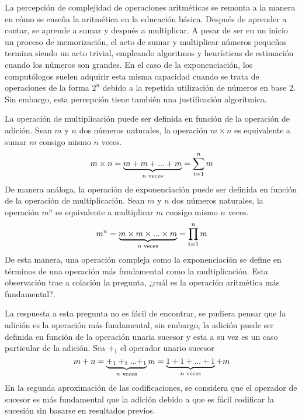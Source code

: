 La percepción de complejidad de operaciones aritméticas se remonta a la manera en cómo se enseña la aritmética en la educación básica. Después de aprender a contar, se aprende a sumar y después a multiplicar. A pesar de ser en un inicio un proceso de memorización, el acto de sumar y multiplicar números pequeños termina siendo un acto trivial, empleando algoritmos y heurísticas de estimación cuando los números son grandes. En el caso de la exponenciación, los computólogos suelen adquirir esta misma capacidad cuando se trata de operaciones de la forma $ 2^{n} $ debido a la repetida utilización de números en base 2. Sin embargo, esta percepción tiene también una justificación algorítmica.

La operación de multiplicación puede ser definida en función de la operación de adición. Sean $ m $ y $ n $ dos números naturales, la operación $ m \times n $ es equivalente a sumar $ m $ consigo mismo $ n $ veces.
\begin{equation}
  \label{eq:numeral:muldef}
  m \times n = \underbrace{m + m + ... + m}_\text{$ n $ veces} = \sum_{i=1}^{n} m
\end{equation}
De manera análoga, la operación de exponenciación puede ser definida en función de la operación de multiplicación. Sean $ m $ y $ n $ dos números naturales, la operación $ m^{n} $ es equivalente a multiplicar $ m $ consigo mismo $ n $ veces.
\begin{equation}
  \label{eq:numeral:expdef}
  m^{n} = \underbrace{m \times m \times ... \times m}_\text{$ n $ veces} = \prod_{i=1}^{n} m
\end{equation}
De esta manera, una operación compleja como la exponenciación se define en términos de una operación más fundamental como la multiplicación. Esta observación trae a colación la pregunta, ¿cuál es la operación aritmética más fundamental?.

La respuesta a esta pregunta no es fácil de encontrar, se pudiera pensar que la adición es la operación más fundamental, sin embargo, la adición puede ser definida en función de la operación unaria sucesor y esta a su vez es un caso particular de la adición. Sea $ +_{1} $ el operador unario sucesor
\[ m + n = \underbrace{+_{1} +_{1} ... {} +_{1}}_\text{$ n $ veces} m = \underbrace{1 + 1 + ... + 1}_\text{$ n $ veces}+m \]
En la segunda aproximación de las codificaciones, se considera que el operador de sucesor es más fundamental que la adición debido a que es fácil codificar la sucesión sin basarse en resultados previos.

